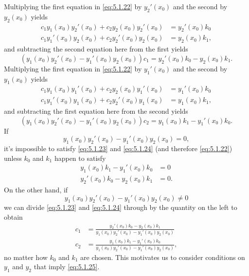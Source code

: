 Multiplying the first equation in \eqref{eq:5.1.22} by $y_2'(x_0)$
and the second by $y_2(x_0)$ yields
\begin{align*}
c_1y_1(x_0)y_2'(x_0)+c_2y_2(x_0)y_2'(x_0)&= y_2'(x_0)k_0\\
c_1y_1'(x_0)y_2(x_0)+c_2y_2'(x_0)y_2(x_0)&= y_2(x_0)k_1,
\end{align*}
and subtracting the second equation here from the first yields
\begin{equation}\label{eq:5.1.23}
\left(y_1(x_0)y_2'(x_0)-y_1'(x_0)y_2(x_0)\right)c_1=
y_2'(x_0)k_0-y_2(x_0)k_1.
\end{equation}
Multiplying the first equation in \eqref{eq:5.1.22} by $y_1'(x_0)$
and the second by $y_1(x_0)$ yields
\begin{align*}
c_1y_1(x_0)y_1'(x_0)+c_2y_2(x_0)y_1'(x_0)&= y_1'(x_0)k_0\\
c_1y_1'(x_0)y_1(x_0)+c_2y_2'(x_0)y_1(x_0)&= y_1(x_0)k_1,
\end{align*}
and subtracting the first equation here from the second yields
\begin{equation}\label{eq:5.1.24}
\left(y_1(x_0)y_2'(x_0)-y_1'(x_0)y_2(x_0)\right)c_2=
y_1(x_0)k_1-y_1'(x_0)k_0.
\end{equation}
If
\[
y_1(x_0)y_2'(x_0)-y_1'(x_0)y_2(x_0)=0,
\]
 it's impossible to satisfy \eqref{eq:5.1.23} and \eqref{eq:5.1.24}
(and therefore \eqref{eq:5.1.22})
unless $k_0$ and $k_1$ happen to satisfy
\begin{align*}
y_1(x_0)k_1-y_1'(x_0)k_0&=0\\
y_2'(x_0)k_0-y_2(x_0)k_1&=0.
\end{align*}
On the other hand, if
\begin{equation}\label{eq:5.1.25}
y_1(x_0)y_2'(x_0)-y_1'(x_0)y_2(x_0)\ne0
\end{equation}
 we can  divide \eqref{eq:5.1.23} and \eqref{eq:5.1.24} through by the
quantity on the left  to obtain
\begin{equation}\label{eq:5.1.26}
\begin{aligned}
c_1&=\frac{y_2'(x_0)k_0-y_2(x_0)k_1}{y_1(x_0)y_2'(x_0)-y_1'(x_0)y_2(x_0)}\\
c_2&=\frac{y_1(x_0)k_1-y_1'(x_0)k_0}{y_1(x_0)y_2'(x_0)-y_1'(x_0)y_2(x_0)},
\end{aligned}
\end{equation}
no matter how $k_0$ and $k_1$ are chosen. This motivates us to
consider conditions on $y_1$ and $y_2$ that imply \eqref{eq:5.1.25}.

